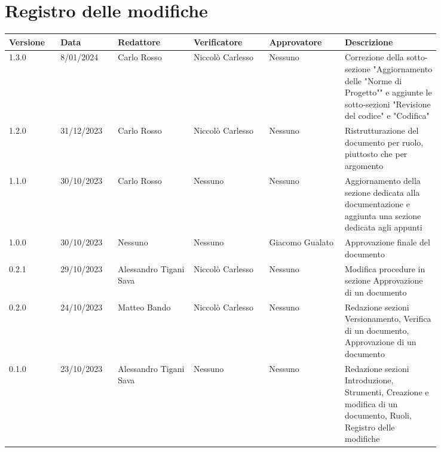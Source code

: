 \section*{Registro delle modifiche}
 {
  \scriptsize
  \begin{tabular}{p{0.10\linewidth}p{0.10\linewidth}p{0.15\linewidth}p{0.15\linewidth}p{0.15\linewidth}p{0.19\linewidth}}
	  \textbf{Versione} & \textbf{Data} & \textbf{Redattore}     & \textbf{Verificatore} & \textbf{Approvatore} & \textbf{Descrizione}                                                                                             \\
	  \hline
	  1.3.0             & 8/01/2024     & Carlo Rosso            & Niccolò Carlesso      & Nessuno              & Correzione della sotto-sezione "Aggiornamento
	  delle "Norme di Progetto"" e aggiunte le sotto-sezioni "Revisione del codice" e "Codifica"                                                                                                                                   \\
	  \hline
	  1.2.0             & 31/12/2023    & Carlo Rosso            & Niccolò Carlesso      & Nessuno              & Ristrutturazione del documento per ruolo, piuttosto che per argomento                                            \\
	  \hline
	  1.1.0             & 30/10/2023    & Carlo Rosso            & Nessuno               & Nessuno              & Aggiornamento della sezione dedicata alla documentazione e aggiunta una sezione dedicata agli appunti            \\
	  \hline
	  1.0.0             & 30/10/2023    & Nessuno                & Nessuno               & Giacomo Gualato      & Approvazione finale del documento                                                                                \\
	  \hline
	  0.2.1             & 29/10/2023    & Alessandro Tigani Sava & Niccolò Carlesso      & Nessuno              & Modifica procedure in sezione Approvazione di un documento                                                       \\
	  \hline
	  0.2.0             & 24/10/2023    & Matteo Bando           & Niccolò Carlesso      & Nessuno              & Redazione sezioni Versionamento, Verifica di un documento, Approvazione di un documento                          \\
	  \hline
	  0.1.0             & 23/10/2023    & Alessandro Tigani Sava & Nessuno               & Nessuno              & Redazione sezioni Introduzione, Strumenti, Creazione e modifica di un documento, Ruoli, Registro delle modifiche \\
	  \hline
  \end{tabular}
 }
